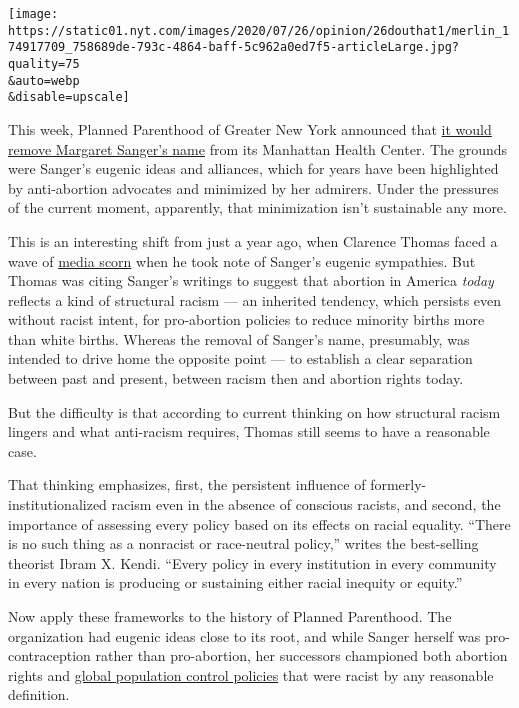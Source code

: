 \texttt{[image: https://static01.nyt.com/images/2020/07/26/opinion/26douthat1/merlin\_174917709\_758689de-793c-4864-baff-5c962a0ed7f5-articleLarge.jpg?quality=75\\\&auto=webp\\\&disable=upscale]}

This week, Planned Parenthood of Greater New York announced that
\href{https://www.cnn.com/2020/07/22/us/margaret-sanger-planned-parenthood-trnd/index.html}{it
would remove Margaret Sanger's name} from its Manhattan Health Center.
The grounds were Sanger's eugenic ideas and alliances, which for years
have been highlighted by anti-abortion advocates and minimized by her
admirers. Under the pressures of the current moment, apparently, that
minimization isn't sustainable any more.

This is an interesting shift from just a year ago, when Clarence Thomas
faced a wave of
\href{https://www.washingtonpost.com/history/2019/05/31/clarence-thomas-tried-link-abortion-eugenics-seven-historians-told-post-hes-wrong/?utm_term=.0c5106b1bcd7}{media
scorn} when he took note of Sanger's eugenic sympathies. But Thomas was
citing Sanger's writings to suggest that abortion in America
\emph{today} reflects a kind of structural racism --- an inherited
tendency, which persists even without racist intent, for pro-abortion
policies to reduce minority births more than white births. Whereas the
removal of Sanger's name, presumably, was intended to drive home the
opposite point --- to establish a clear separation between past and
present, between racism then and abortion rights today.

But the difficulty is that according to current thinking on how
structural racism lingers and what anti-racism requires, Thomas still
seems to have a reasonable case.

That thinking emphasizes, first, the persistent influence of
formerly-institutionalized racism even in the absence of conscious
racists, and second, the importance of assessing every policy based on
its effects on racial equality. ``There is no such thing as a nonracist
or race-neutral policy,'' writes the best-selling theorist Ibram X.
Kendi. ``Every policy in every institution in every community in every
nation is producing or sustaining either racial inequity or equity.''

Now apply these frameworks to the history of Planned Parenthood. The
organization had eugenic ideas close to its root, and while Sanger
herself was pro-contraception rather than pro-abortion, her successors
championed both abortion rights and
\href{https://www.hup.harvard.edu/catalog.php?isbn=9780674034600}{global
population control policies} that were racist by any reasonable
definition.

